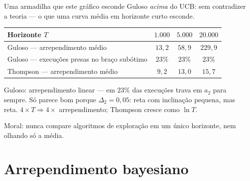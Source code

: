 \documentclass[aspectratio=169, 11pt]{beamer}
\begin{document}
\begin{frame}{Uma armadilha que este gráfico esconde}
  Guloso \emph{acima} do UCB: sem contradizer a teoria — o que uma curva
  média em horizonte curto esconde.

  \smallskip
  \begin{center}\small
  \begin{tabular}{@{}lccc@{}}
    \toprule
    \textbf{Horizonte $T$} & $1{.}000$ & $5{.}000$ & $20{.}000$ \\
    \midrule
    Guloso — arrependimento médio & $13{,}2$ & $58{,}9$ & $229{,}9$ \\
    Guloso — execuções presas no braço subótimo & $23\%$ & $23\%$ & $23\%$ \\
    Thompson — arrependimento médio & $9{,}2$ & $13{,}0$ & $15{,}7$ \\
    \bottomrule
  \end{tabular}
  \end{center}

  \vspace{-0.5em}
  \begin{alertabox}
    Guloso: arrependimento \alert{linear} — em $23\%$ das execuções trava
    em $a_2$ para sempre. Só parece bom porque $\Delta_2 = 0{,}05$:
    reta com inclinação pequena, mas reta. $4\times T \Rightarrow
    4\times$ arrependimento; Thompson cresce como $\ln T$.
  \end{alertabox}

  \smallskip
  {\small\color{rlCinza} Moral: nunca compare algoritmos de exploração em
  um único horizonte, nem olhando só a média.}
\end{frame}

\section{Arrependimento bayesiano}
\end{document}
